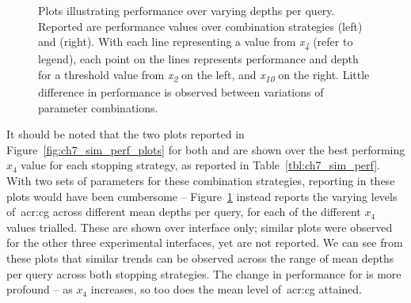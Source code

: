 \begin{figure}[t!]
    \centering
    \caption[\emph{What-if} performance over combination stopping strategies]{Plots illustrating performance over varying depths per query. Reported are performance values over combination strategies  (left) and  (right). With each line representing a value from \emph{x\textsubscript{4}} (refer to legend), each point on the lines represents performance and depth for a threshold value from \emph{x\textsubscript{2}} on the left, and \emph{x\textsubscript{10}} on the right. Little difference in performance is observed between variations of parameter combinations.}
    \label{fig:ch7_sim_perf_plots_combo}
\end{figure}

It should be noted that the two plots reported in Figure~\ref{fig:ch7_sim_perf_plots} for both  and  are shown over the best performing $x_4$ value for each stopping strategy, as reported in Table~\ref{tbl:ch7_sim_perf}. With two sets of parameters for these combination strategies, reporting in these plots would have been cumbersome -- Figure~\ref{fig:ch7_sim_perf_plots_combo} instead reports the varying levels of~\gls{acr:cg} across different mean depths per query, for each of the different $x_4$ values trialled. These are shown over interface  only; similar plots were observed for the other three experimental interfaces, yet are not reported. We can see from these plots that similar trends can be observed across the range of mean depths per query across both stopping strategies. The change in performance for  is more profound -- as $x_4$ increases, so too does the mean level of~\gls{acr:cg} attained.

